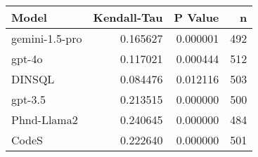 \begin{tabular}{lrrr}
\toprule
Model & Kendall-Tau & P Value & n \\
\midrule
gemini-1.5-pro & 0.165627 & 0.000001 & 492 \\
gpt-4o & 0.117021 & 0.000444 & 512 \\
DINSQL & 0.084476 & 0.012116 & 503 \\
gpt-3.5 & 0.213515 & 0.000000 & 500 \\
Phnd-Llama2 & 0.240645 & 0.000000 & 484 \\
CodeS & 0.222640 & 0.000000 & 501 \\
\bottomrule
\end{tabular}
